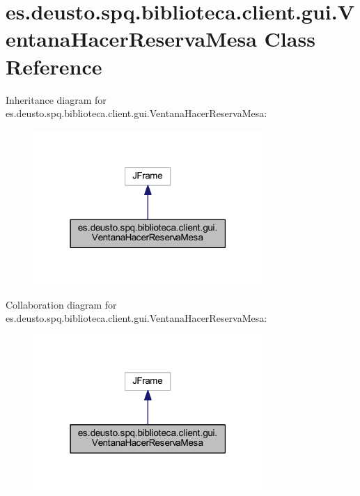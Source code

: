 \hypertarget{classes_1_1deusto_1_1spq_1_1biblioteca_1_1client_1_1gui_1_1_ventana_hacer_reserva_mesa}{}\section{es.\+deusto.\+spq.\+biblioteca.\+client.\+gui.\+Ventana\+Hacer\+Reserva\+Mesa Class Reference}
\label{classes_1_1deusto_1_1spq_1_1biblioteca_1_1client_1_1gui_1_1_ventana_hacer_reserva_mesa}


Inheritance diagram for es.\+deusto.\+spq.\+biblioteca.\+client.\+gui.\+Ventana\+Hacer\+Reserva\+Mesa\+:
\nopagebreak
\begin{figure}[H]
\begin{center}
\leavevmode
\includegraphics[width=247pt]{classes_1_1deusto_1_1spq_1_1biblioteca_1_1client_1_1gui_1_1_ventana_hacer_reserva_mesa__inherit__graph}
\end{center}
\end{figure}


Collaboration diagram for es.\+deusto.\+spq.\+biblioteca.\+client.\+gui.\+Ventana\+Hacer\+Reserva\+Mesa\+:
\nopagebreak
\begin{figure}[H]
\begin{center}
\leavevmode
\includegraphics[width=247pt]{classes_1_1deusto_1_1spq_1_1biblioteca_1_1client_1_1gui_1_1_ventana_hacer_reserva_mesa__coll__graph}
\end{center}
\end{figure}
